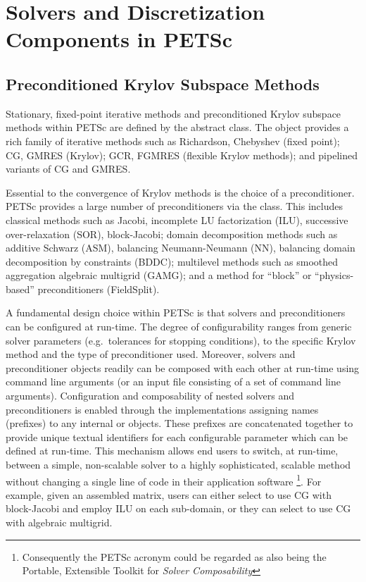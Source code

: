 \documentclass[]{siamart0216}
\begin{document}
\section{Solvers and Discretization Components in PETSc}



\subsection{Preconditioned Krylov Subspace Methods}

Stationary, fixed-point iterative methods and preconditioned Krylov subspace methods within PETSc 
are defined by the  abstract class. The  object provides a rich family of iterative methods such as
Richardson, Chebyshev (fixed point); CG, GMRES (Krylov); GCR, FGMRES (flexible Krylov methods); and pipelined variants of CG and GMRES.

Essential to the convergence of Krylov methods is the choice of a preconditioner.
PETSc provides a large number of preconditioners via the  class. This includes classical methods such as
 Jacobi, incomplete LU factorization (ILU), successive over-relaxation (SOR), block-Jacobi;
domain decomposition methods such as additive Schwarz (ASM), 
balancing Neumann-Neumann (NN), 
balancing domain decomposition by constraints (BDDC);
multilevel methods such as smoothed aggregation algebraic multigrid (GAMG); 
and a method for ``block'' or ``physics-based'' preconditioners (FieldSplit).



A fundamental design choice within PETSc is that solvers and preconditioners can be configured
at run-time. The degree of configurability ranges from generic solver parameters (e.g.~tolerances 
for stopping conditions), to the specific Krylov method and the type of preconditioner used. 
Moreover, solvers and preconditioner objects readily can be composed with each other at run-time 
using command line arguments (or an input file consisting of a set of command line arguments). 
Configuration and composability of nested solvers and preconditioners is enabled through the 
implementations assigning names (prefixes) to any internal  or  objects.
These prefixes are concatenated together to provide unique textual identifiers for each configurable 
parameter which can be defined at run-time.
This mechanism allows end users to switch, at run-time, between a simple, non-scalable solver to a 
highly sophisticated, scalable method without changing a single line of code in their application software
\footnote{Consequently the PETSc acronym could be regarded as also being the Portable, Extensible Toolkit for \textit{Solver Composability}}.
For example, given an assembled matrix, users can either select to use CG with block-Jacobi and employ 
ILU on each sub-domain, or they can select to use CG with algebraic multigrid.
\end{document}
